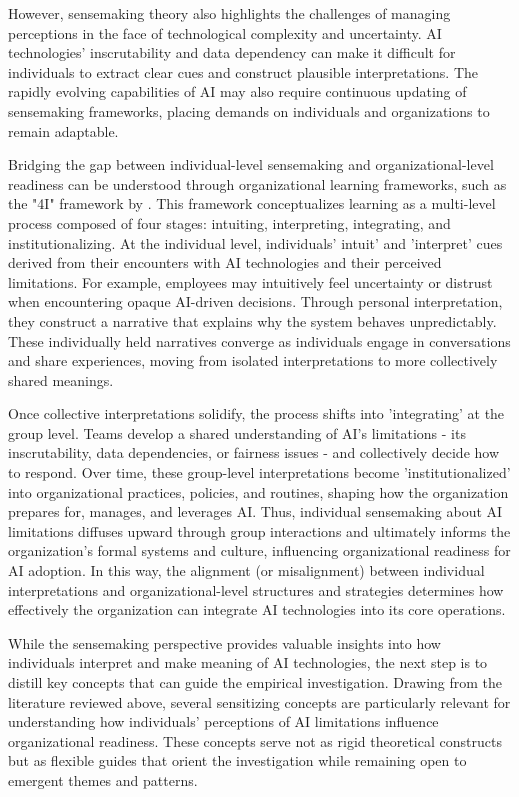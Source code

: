 However, sensemaking theory also highlights the challenges of managing perceptions in the face of technological complexity and uncertainty. AI technologies' inscrutability and data dependency \citep{Weber2023} can make it difficult for individuals to extract clear cues and construct plausible interpretations. The rapidly evolving capabilities of AI may also require continuous updating of sensemaking frameworks, placing demands on individuals and organizations to remain adaptable.

Bridging the gap between individual-level sensemaking and organizational-level readiness can be understood through organizational learning frameworks, such as the "4I" framework by \cite{Crossan1999}. This framework conceptualizes learning as a multi-level process composed of four stages: intuiting, interpreting, integrating, and institutionalizing. At the individual level, individuals' intuit' and 'interpret' cues derived from their encounters with AI technologies and their perceived limitations. For example, employees may intuitively feel uncertainty or distrust when encountering opaque AI-driven decisions. Through personal interpretation, they construct a narrative that explains why the system behaves unpredictably. These individually held narratives converge as individuals engage in conversations and share experiences, moving from isolated interpretations to more collectively shared meanings.

Once collective interpretations solidify, the process shifts into 'integrating' at the group level. Teams develop a shared understanding of AI's limitations - its inscrutability, data dependencies, or fairness issues - and collectively decide how to respond. Over time, these group-level interpretations become 'institutionalized' into organizational practices, policies, and routines, shaping how the organization prepares for, manages, and leverages AI. Thus, individual sensemaking about AI limitations diffuses upward through group interactions and ultimately informs the organization's formal systems and culture, influencing organizational readiness for AI adoption. In this way, the alignment (or misalignment) between individual interpretations and organizational-level structures and strategies determines how effectively the organization can integrate AI technologies into its core operations.

While the sensemaking perspective provides valuable insights into how individuals interpret and make meaning of AI technologies, the next step is to distill key concepts that can guide the empirical investigation. Drawing from the literature reviewed above, several sensitizing concepts are particularly relevant for understanding how individuals' perceptions of AI limitations influence organizational readiness. These concepts serve not as rigid theoretical constructs but as flexible guides that orient the investigation while remaining open to emergent themes and patterns.

